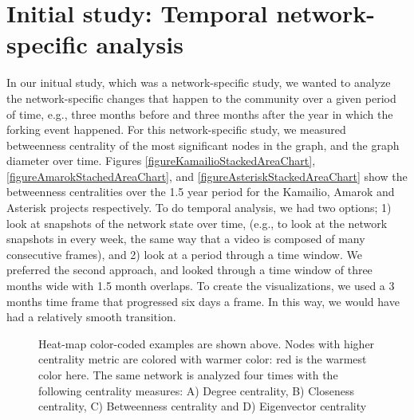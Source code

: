 \documentclass{acm_proc_article-sp}
\begin{document}
\section{Initial study: Temporal network-specific analysis}
\label{sectionInitialStudy}
In our initual study\cite{AzarbakhtOpenSym2013}\cite{AzarbakhtOSS2013}\cite{AzarbakhtVLHCC2014}, which was a network-specific study, we wanted to analyze the network-specific changes that happen to the community over a given period of time, e.g., three months before and three months after the year in which the forking event happened. For this network-specific study, we measured betweenness centrality \cite{Brandes} of the most significant nodes in the graph, and the graph diameter over time. Figures \ref{figureKamailioStackedAreaChart}, \ref{figureAmarokStachedAreaChart}, and \ref{figureAsteriskStackedAreaChart} show the betweenness centralities over the 1.5 year period for the Kamailio, Amarok and Asterisk projects respectively. To do temporal analysis, we had two options; 1) look at snapshots of the network state over time, (e.g., to look at the network snapshots in every week, the same way that a video is composed of many consecutive frames), and 2) look at a period through a time window. We preferred the second approach, and looked through a time window of three months wide with 1.5 month overlaps. To create the visualizations, we used a 3 months time frame that progressed six days a frame. In this way, we would have had a relatively smooth transition.

\begin{figure}[!ht]
\centering
{}
\caption{Heat-map color-coded examples are shown above. Nodes with higher centrality metric are colored with warmer color: red is the warmest color here. The same network is analyzed four times with the following centrality measures:  A) Degree centrality, B) Closeness centrality, C) Betweenness centrality and D) Eigenvector centrality \cite{Rocchini}}
\label{figureCentrality}
\end{figure}
\end{document}

